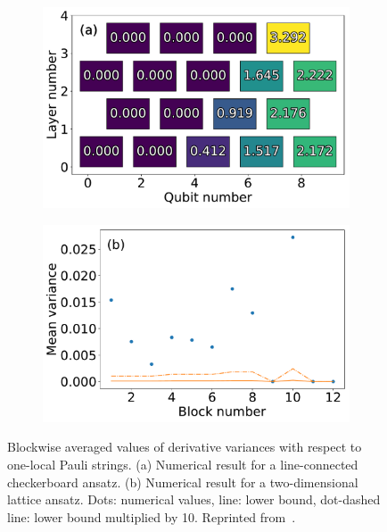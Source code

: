\begin{figure}
    \centering
    \begin{subfigure}{.48\linewidth}
        \centering
        \includegraphics[width=\linewidth]{figures/line_endpoint.pdf}
    \end{subfigure}
    \begin{subfigure}{.48\linewidth}
        \centering
        \includegraphics[width=\linewidth]{figures/lattice_scatter.pdf}
    \end{subfigure}
    \caption{Blockwise averaged values of derivative variances with respect to one-local Pauli strings. (a) Numerical result for a line-connected checkerboard ansatz. (b) Numerical result for a two-dimensional lattice ansatz. Dots: numerical values, line: lower bound,  dot-dashed line: lower bound multiplied by 10. Reprinted from~\cite{uvarov_barren_2021}.}
    \label{fig:alt_connect}
\end{figure}


